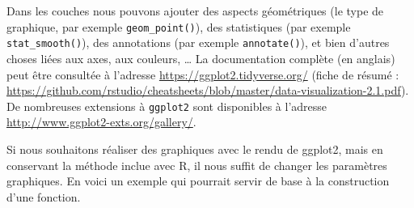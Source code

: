\documentclass[
]{book}
\begin{document}
Dans les couches nous pouvons ajouter des aspects géométriques (le type de graphique, par exemple \texttt{geom\_point()}), des statistiques (par exemple \texttt{stat\_smooth()}), des annotations (par exemple \texttt{annotate()}), et bien d'autres choses liées aux axes, aux couleurs, \ldots{} La documentation complète (en anglais) peut être consultée à l'adresse \url{https://ggplot2.tidyverse.org/} (fiche de résumé : \url{https://github.com/rstudio/cheatsheets/blob/master/data-visualization-2.1.pdf}). De nombreuses extensions à \texttt{ggplot2} sont disponibles à l'adresse \url{http://www.ggplot2-exts.org/gallery/}.

Si nous souhaitons réaliser des graphiques avec le rendu de ggplot2, mais en conservant la méthode inclue avec R, il nous suffit de changer les paramètres graphiques. En voici un exemple qui pourrait servir de base à la construction d'une fonction.
\end{document}
